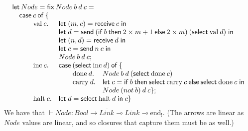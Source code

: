 \documentclass[orivec,envcountsame]{llncs}
\newcommand{\gvdual}[1]{\overline{#1}}
\newcommand{\lto}{\ensuremath{\multimap}}
\newcommand{\uto}{\ensuremath{\rightarrow}}
\newcommand{\outterm}{\mathrm{end}_!}
\newcommand{\gvtyp}[3]{#1 \vdash #2 : #3}
\newcommand{\mkwd}[1]{\mathsf{#1}}
\newcommand{\clabel}[1]{\mathrm{#1}}
\newcommand{\gvsend}[2]{\mkwd{send}\:#1\:#2}
\newcommand{\gvreceive}[1]{\mkwd{receive}\:#1}
\newcommand{\gvlet}[3]{\mkwd{let}\;#1 = #2\;\mkwd{in}\;#3}
\newcommand{\gvselect}[2]{\mkwd{select}\:#1\:#2}
\newcommand{\lrkwd}{\mkwd{fix}}
\begin{document}
%
\[\begin{array}{lllll}
\mcl{5}{\mkwd{let}\:Node = \lrkwd\:Node\:b\:d\:c =} \\
\mcl{5}{\quad \mkwd{case}\:c\:\mkwd{of}\:\{} \\
\quad \quad & \clabel{val}\:c. & \mcl{3}{\gvlet{(m,c)}{\gvreceive{c}}{}} \\
& & \mcl{3}{\gvlet{d}{\gvsend{(\gvifthen{b}{2 \times m + 1}{2 \times m})}{(\gvselect{\clabel{val}}{d})}}{}} \\
& & \mcl{3}{\gvlet{(n,d)}{\gvreceive{d}}{}} \\
& & \mcl{3}{\gvlet{c}{\gvsend{n}{c}}{}} \\
& & \mcl{3}{Node\:b\:d\:c;} \\
& \clabel{inc}\:c. & \mcl{3}{\mkwd{case}\:(\gvselect{\clabel{inc}}{d})\:\mkwd{of}\:\{} \\
& & \quad & \clabel{done}\:d. & Node\:b\:d\:(\gvselect{\clabel{done}}{c}) \\
& & & \clabel{carry}\:d. & \gvlet{c}{\gvifthen{b}{\gvselect{\clabel{carry}}{c}}{\gvselect{\clabel{done}}{c}}}{} \\
& & & & Node\:(not\:b)\:d\:c \}; \\
& \clabel{halt}\:c. & \mcl{3}{\gvlet{d}{\gvselect{\clabel{halt}}{d}}{c} \}}
\end{array}\]
We have that $\gvtyp{}{Node}{Bool \uto \gvdual{Link} \lto Link \lto \outterm}.$ (The arrows are linear as
$Node$ values are linear, and so closures that capture them must be as well.)
\end{document}
